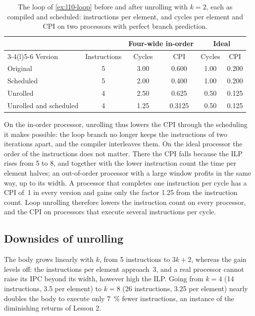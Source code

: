 \documentclass[../main.tex]{subfiles}
\begin{document}
\begin{table}[htbp]
  \centering\small
  \caption{The loop of \cref{ex:l10-loop} before and after unrolling with
    $k=2$, each as compiled and scheduled: instructions per element, and
    cycles per element and CPI on two processors with perfect branch
    prediction.}
  \label{tab:l10-unrolling}
  \begin{tabular}{@{}lccccc@{}}
    \toprule
    & & \multicolumn{2}{c}{Four-wide in-order} & \multicolumn{2}{c}{Ideal} \\
    \cmidrule(lr){3-4}\cmidrule(l){5-6}
    Version & Instructions & Cycles & CPI & Cycles & CPI \\
    \midrule
    Original               & 5 & 3.00 & 0.600  & 1.00 & 0.200 \\
    Scheduled              & 5 & 2.00 & 0.400  & 1.00 & 0.200 \\
    Unrolled               & 4 & 2.50 & 0.625  & 0.50 & 0.125 \\
    Unrolled and scheduled & 4 & 1.25 & 0.3125 & 0.50 & 0.125 \\
    \bottomrule
  \end{tabular}
\end{table}

On the in-order processor, unrolling thus lowers the CPI through the
scheduling it makes possible: the loop branch no longer keeps the instructions
of two iterations apart, and the compiler interleaves them.  On the ideal
processor the order of the instructions does not matter.  There the CPI falls
because the ILP rises from 5 to 8, and together with the lower instruction
count the time per element halves; an out-of-order processor with a large
window profits in the same way, up to its width.  A processor that completes
one instruction per cycle has a CPI of~1 in every version and gains only the
factor 1.25 from the instruction count.  Loop unrolling therefore lowers the
instruction count on every processor, and the CPI on processors that execute
several instructions per cycle.

\subsection{Downsides of unrolling}
\label{sec:l10-bloat}

The body grows linearly with $k$, from 5 instructions to $3k+2$, whereas the
gain levels off: the instructions per element approach~3, and a real
processor cannot raise its IPC beyond its width, however high the ILP.  Going
from $k=4$ (14 instructions, 3.5 per element) to $k=8$ (26 instructions, 3.25
per element) nearly doubles the body to execute only \SI{7}{\percent} fewer
instructions, an instance of the diminishing returns of Lesson 2.
\end{document}
